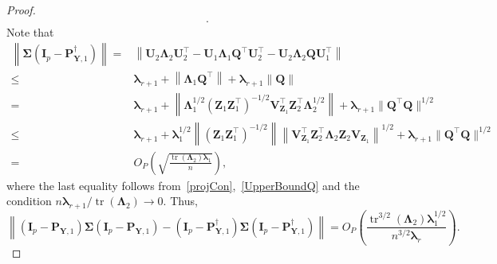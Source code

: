 \documentclass[10pt]{book}
\theoremstyle{definition}
\DeclareMathOperator{\mytr}{tr}
\newcommand{\bQ}{\mathbf{Q}}
\newcommand{\bZ}{\mathbf{Z}}
\newcommand{\bP}{\mathbf{P}}
\newcommand{\bY}{\mathbf{Y}}
\newcommand{\bI}{\mathbf{I}}
\newcommand{\bU}{\mathbf{U}}
\newcommand{\bV}{\mathbf{V}}
\newcommand{\bfsym}[1]{\ensuremath{\boldsymbol{#1}}}
\def\blambda {\bfsym {\lambda}}
\def\bLambda {\bfsym {\Lambda}}
\def\bSigma {\bfsym {\Sigma}}
\begin{document}
\begin{proof}
\begin{equation*}
\begin{split}
         .
         \end{split}
         \end{equation*}
Note that
\begin{equation*}
    \begin{split}
         \left\|\bSigma 
         (\bI_p-\bP_{\bY,1}^{\dagger})\right\|
         =&
         \left\|
         \bU_2 \bLambda_2 \bU_2^\top
         -\bU_1 \bLambda_1 \bQ^\top \bU_2^\top
         -\bU_2 \bLambda_2 \bQ \bU_1^\top
         \right\|
         \\
         \leq &
         \blambda_{r+1}
         +
         \left\|
          \bLambda_1 \bQ^\top
          \right\|
          +
          \blambda_{r+1}
          \left\|
          \bQ 
         \right\|
         \\
         = &
         \blambda_{r+1}
         +
         \left\|
         \bLambda_1^{1/2} (\bZ_1 \bZ_1^\top)^{-1/2} \bV_{\bZ_1}^\top \bZ_2^\top \bLambda_2^{1/2}
         \right\|
         +
         \blambda_{r+1}\|\bQ^\top \bQ\|^{1/2}
         \\
         \leq &
         \blambda_{r+1}
         +
         \blambda_1^{1/2}
         \left\|
        (\bZ_1 \bZ_1^\top)^{-1/2}
         \right\|
         \left\|
         \bV_{\bZ_1}^\top \bZ_2^\top \bLambda_2 \bZ_2 \bV_{\bZ_1}
         \right\|^{1/2}
         +
         \blambda_{r+1}\|\bQ^\top \bQ\|^{1/2}
         \\
         =&
         O_P\left(\sqrt{\frac{\mytr(\bLambda_2)\blambda_1}{n}}\right),
    \end{split}
\end{equation*}
where the last equality follows from~\eqref{projCon},~\eqref{UpperBoundQ} and the condition $n\blambda_{r+1}/\mytr(\bLambda_2)\to 0$.
Thus,
\begin{equation}\label{choc1}
         \left\|
         (\bI_p-\bP_{\bY,1})
         \bSigma 
         (\bI_p-\bP_{\bY,1})
         -
         (\bI_p-\bP_{\bY,1}^{\dagger})
         \bSigma 
         (\bI_p-\bP_{\bY,1}^{\dagger})
         \right\|
         = 
         O_P\left(\frac{\mytr^{3/2}(\bLambda_2)\blambda_1^{1/2}}{n^{3/2}\blambda_r}\right)
         .
         \end{equation}


\end{proof}
\end{document}
